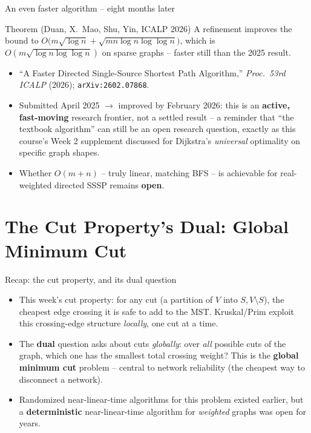 \documentclass[11pt,aspectratio=169]{beamer}
\begin{document}
\begin{frame}{An even faster algorithm -- eight months later}
  \begin{block}{Theorem (Duan, X.~Mao, Shu, Yin, ICALP 2026)}
    A refinement improves the bound to
    $O\!\big(m\sqrt{\log n} + \sqrt{mn\log n\log\log n}\big)$, which is
    $O(m\sqrt{\log n\log\log n})$ on sparse graphs -- faster still than the 2025
    result.
  \end{block}
  \begin{itemize}
    \item ``A Faster Directed Single-Source Shortest Path Algorithm,''
    \emph{Proc.\ 53rd ICALP} (2026); \texttt{arXiv:2602.07868}.
    \item Submitted April 2025 $\to$ improved by February 2026: this is an
    \textbf{active, fast-moving} research frontier, not a settled result -- a
    reminder that ``the textbook algorithm'' can still be an open research
    question, exactly as this course's Week 2 supplement discussed for Dijkstra's
    \emph{universal} optimality on specific graph shapes.
    \item Whether $O(m+n)$ -- truly linear, matching BFS -- is achievable for
    real-weighted directed SSSP remains \textbf{open}.
  \end{itemize}
\end{frame}

\section{The Cut Property's Dual: Global Minimum Cut}

\begin{frame}{Recap: the cut property, and its dual question}
  \begin{itemize}
    \item This week's cut property: for any cut (a partition of $V$ into
    $S, V\setminus S$), the cheapest edge crossing it is safe to add to the MST.
    Kruskal/Prim exploit this crossing-edge structure \emph{locally}, one cut at
    a time.
    \item The \textbf{dual} question asks about cuts \emph{globally}: over
    \emph{all} possible cuts of the graph, which one has the smallest total
    crossing weight? This is the \textbf{global minimum cut} problem -- central
    to network reliability (the cheapest way to disconnect a network).
    \item Randomized near-linear-time algorithms for this problem existed
    earlier, but a \textbf{deterministic} near-linear-time algorithm for
    \emph{weighted} graphs was open for years.
  \end{itemize}
\end{frame}
\end{document}
